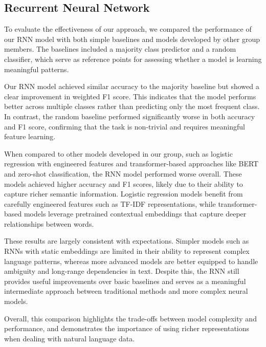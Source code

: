 \subsection{Recurrent Neural Network}

To evaluate the effectiveness of our approach, we compared the performance of our RNN model with both simple baselines and models developed by other group members. The baselines included a majority class predictor and a random classifier, which serve as reference points for assessing whether a model is learning meaningful patterns.

Our RNN model achieved similar accuracy to the majority baseline but showed a clear improvement in weighted F1 score. This indicates that the model performs better across multiple classes rather than predicting only the most frequent class. In contrast, the random baseline performed significantly worse in both accuracy and F1 score, confirming that the task is non-trivial and requires meaningful feature learning.

When compared to other models developed in our group, such as logistic regression with engineered features and transformer-based approaches like BERT and zero-shot classification, the RNN model performed worse overall. These models achieved higher accuracy and F1 scores, likely due to their ability to capture richer semantic information. Logistic regression models benefit from carefully engineered features such as TF-IDF representations, while transformer-based models leverage pretrained contextual embeddings that capture deeper relationships between words.

These results are largely consistent with expectations. Simpler models such as RNNs with static embeddings are limited in their ability to represent complex language patterns, whereas more advanced models are better equipped to handle ambiguity and long-range dependencies in text. Despite this, the RNN still provides useful improvements over basic baselines and serves as a meaningful intermediate approach between traditional methods and more complex neural models.

Overall, this comparison highlights the trade-offs between model complexity and performance, and demonstrates the importance of using richer representations when dealing with natural language data.